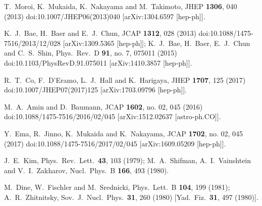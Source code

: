 \documentclass[12pt, a4paper]{article}
\begin{document}
\begin{thebibliography}{99}
  T.~Moroi, K.~Mukaida, K.~Nakayama and M.~Takimoto,
  JHEP {\bf 1306}, 040 (2013)
  doi:10.1007/JHEP06(2013)040
  [arXiv:1304.6597 [hep-ph]].
  
  K.~J.~Bae, H.~Baer and E.~J.~Chun,
  JCAP {\bf 1312}, 028 (2013)
  doi:10.1088/1475-7516/2013/12/028
  [arXiv:1309.5365 [hep-ph]];
  K.~J.~Bae, H.~Baer, E.~J.~Chun and C.~S.~Shin,
  Phys.\ Rev.\ D {\bf 91}, no. 7, 075011 (2015)
  doi:10.1103/PhysRevD.91.075011
  [arXiv:1410.3857 [hep-ph]].
  
  R.~T.~Co, F.~D'Eramo, L.~J.~Hall and K.~Harigaya,
  JHEP {\bf 1707}, 125 (2017)
  doi:10.1007/JHEP07(2017)125
  [arXiv:1703.09796 [hep-ph]].
      
  M.~A.~Amin and D.~Baumann,
  JCAP {\bf 1602}, no. 02, 045 (2016)
  doi:10.1088/1475-7516/2016/02/045
  [arXiv:1512.02637 [astro-ph.CO]].
  
  Y.~Ema, R.~Jinno, K.~Mukaida and K.~Nakayama,
  JCAP {\bf 1702}, no. 02, 045 (2017)
  doi:10.1088/1475-7516/2017/02/045
  [arXiv:1609.05209 [hep-ph]].
  
  J.~E.~Kim,
  Phys.\ Rev.\ Lett.\  {\bf 43}, 103 (1979);
  M.~A.~Shifman, A.~I.~Vainshtein and V.~I.~Zakharov,
  Nucl.\ Phys.\  B {\bf 166}, 493 (1980).
  
  M.~Dine, W.~Fischler and M.~Srednicki,
  Phys.\ Lett.\  B {\bf 104}, 199 (1981);
  A.~R.~Zhitnitsky,
  Sov.\ J.\ Nucl.\ Phys.\  {\bf 31}, 260 (1980)
  [Yad.\ Fiz.\  {\bf 31}, 497 (1980)].
  

\end{thebibliography}
\end{document}
